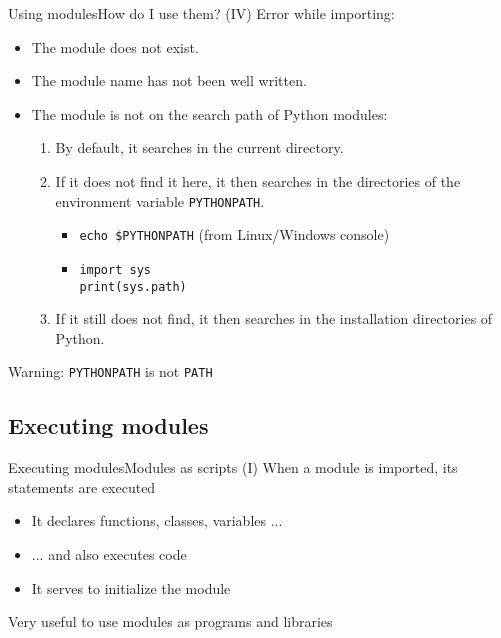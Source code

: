\documentclass[10pt,compress]{beamer} %
\begin{document}
\begin{frame}[fragile]{Using modules}{How do I use them?  (IV)}
	Error while importing:
	\begin{itemize}
	\item The module does not exist.
	\item The module name has not been well written.
	\item The module is not on the search path of Python modules:
	\begin{enumerate}
	\item By default, it searches in the current directory.
	\item If it does not find it here, it then searches in the directories of the environment variable \texttt{PYTHONPATH}.
	\begin{itemize}
	\item \texttt{echo \$PYTHONPATH} (from Linux/Windows console)
	\item \texttt{import sys}\\
	\texttt{print(sys.path)}
	\end{itemize}
	\item If it still does not find, it then searches in the installation directories of Python.
	\end{enumerate}
	\end{itemize}
    Warning: \texttt{PYTHONPATH} is not \texttt{PATH}
\end{frame} 
	
\subsection{Executing modules}

\begin{frame}{Executing modules}{Modules as scripts (I)}
	When a module is imported, its statements are executed
		\begin{itemize}
		\item It declares functions, classes, variables ...
		\item ... and also executes code
		\item It serves to initialize the module
		\end{itemize}
	Very useful to use modules as programs and libraries
\end{frame}
\end{document}
